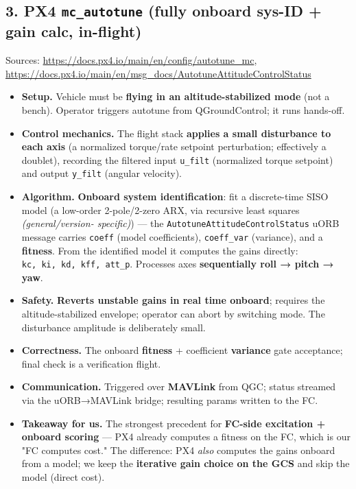 \documentclass[
  11pt,
]{article}
\providecommand{\tightlist}{%
  \setlength{\itemsep}{0pt}\setlength{\parskip}{0pt}}
\begin{document}
\hypertarget{3-px4-mc_autotune-fully-onboard-sys-id--gain-calc-in-flight}{%
\subsection{\texorpdfstring{3. PX4 \texttt{mc\_autotune} (fully onboard
sys-ID + gain calc,
in-flight)}{3. PX4 mc\_autotune (fully onboard sys-ID + gain calc, in-flight)}}\label{3-px4-mc_autotune-fully-onboard-sys-id--gain-calc-in-flight}}

Sources: \url{https://docs.px4.io/main/en/config/autotune_mc},
\url{https://docs.px4.io/main/en/msg_docs/AutotuneAttitudeControlStatus}

\begin{itemize}
\tightlist
\item
  \textbf{Setup.} Vehicle must be \textbf{flying in an
  altitude-stabilized mode} (not a bench). Operator triggers autotune
  from QGroundControl; it runs hands-off.
\item
  \textbf{Control mechanics.} The flight stack \textbf{applies a small
  disturbance to each axis} (a normalized torque/rate setpoint
  perturbation; effectively a doublet), recording the filtered input
  \texttt{u\_filt} (normalized torque setpoint) and output
  \texttt{y\_filt} (angular velocity).
\item
  \textbf{Algorithm.} \textbf{Onboard system identification}: fit a
  discrete-time SISO model (a low-order 2-pole/2-zero ARX, via recursive
  least squares \emph{(general/version- specific)}) --- the
  \texttt{AutotuneAttitudeControlStatus} uORB message carries
  \texttt{coeff} (model coefficients), \texttt{coeff\_var} (variance),
  and a \textbf{fitness}. From the identified model it computes the
  gains directly: \texttt{kc,\ ki,\ kd,\ kff,\ att\_p}. Processes axes
  \textbf{sequentially roll → pitch → yaw}.
\item
  \textbf{Safety.} \textbf{Reverts unstable gains in real time onboard};
  requires the altitude-stabilized envelope; operator can abort by
  switching mode. The disturbance amplitude is deliberately small.
\item
  \textbf{Correctness.} The onboard \textbf{fitness} + coefficient
  \textbf{variance} gate acceptance; final check is a verification
  flight.
\item
  \textbf{Communication.} Triggered over \textbf{MAVLink} from QGC;
  status streamed via the uORB→MAVLink bridge; resulting params written
  to the FC.
\item
  \textbf{Takeaway for us.} The strongest precedent for \textbf{FC-side
  excitation + onboard scoring} --- PX4 already computes a fitness on
  the FC, which is our "FC computes cost." The difference: PX4
  \emph{also} computes the gains onboard from a model; we keep the
  \textbf{iterative gain choice on the GCS} and skip the model (direct
  cost).
\end{itemize}
\end{document}

